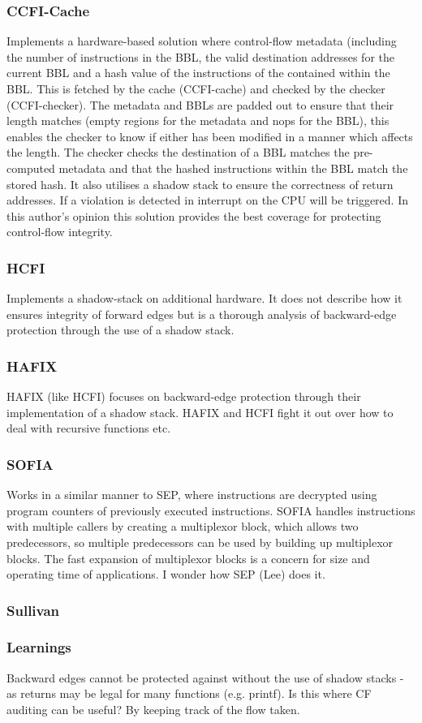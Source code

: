 \subsubsection{CCFI-Cache}
Implements a hardware-based solution where control-flow metadata (including the number of instructions in the BBL, the valid destination addresses for the current BBL and a hash value of the instructions of the contained within the BBL. This is fetched by the cache (CCFI-cache) and checked by the checker (CCFI-checker). The metadata and BBLs are padded out to ensure that their length matches (empty regions for the metadata and nops for the BBL), this enables the checker to know if either has been modified in a manner which affects the length. The checker checks the destination of a BBL matches the pre-computed metadata and that the hashed instructions within the BBL match the stored hash. It also utilises a shadow stack to ensure the correctness of return addresses. If a violation is detected in interrupt on the CPU will be triggered. In this author's opinion this solution provides the best coverage for protecting control-flow integrity.

\subsubsection{HCFI}
Implements a shadow-stack on additional hardware. It does not describe how it ensures integrity of forward edges but is a thorough analysis of backward-edge protection through the use of a shadow stack.

\subsubsection{HAFIX}
HAFIX (like HCFI) focuses on backward-edge protection through their implementation of a shadow stack. HAFIX and HCFI fight it out over how to deal with recursive functions etc.

\subsubsection{SOFIA}
Works in a similar manner to SEP, where instructions are decrypted using program counters of previously executed instructions. SOFIA handles instructions with multiple callers by creating a multiplexor block, which allows two predecessors, so multiple predecessors can  be used by building up multiplexor blocks. The fast expansion of multiplexor blocks is a concern for size and operating time of applications. I wonder how SEP (Lee) does it.

\subsubsection{Sullivan}


\subsubsection{Learnings}
Backward edges cannot be protected against without the use of shadow stacks - as returns may be legal for many functions (e.g. printf). Is this where CF auditing can be useful? By keeping track of the flow taken.